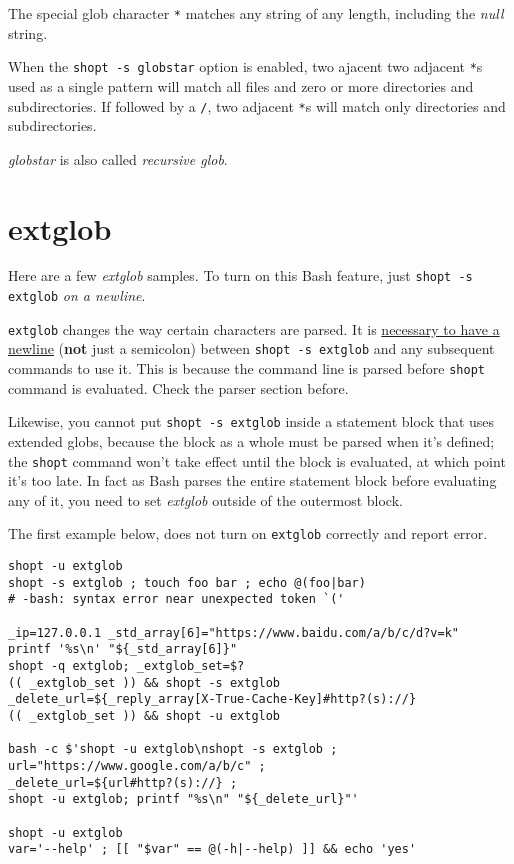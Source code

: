 The special glob character \lstinline|*| matches any string of any
length, including the \textit{null} string.

When the \lstinline|shopt -s globstar| option is enabled, two
ajacent two adjacent \lstinline|*|s used as a single pattern will
match all files and zero or more directories and subdirectories.
If followed by a \lstinline|/|, two adjacent \lstinline|*|s will
match only directories and subdirectories.

\textit{globstar} is also called \textit{recursive glob}.

\section{extglob}
\label{sec:bash-extglob}

Here are a few \textit{extglob} samples. To turn on this Bash
feature, just \lstinline|shopt -s extglob| \textit{on a newline}.

\lstinline|extglob| changes the way certain characters are
parsed. It is
\href{https://mywiki.wooledge.org/glob#extglob}{necessary to have
  a newline} (\textbf{not} just a semicolon) between
\lstinline|shopt -s extglob| and any subsequent commands to use
it. This is because the command line is parsed before
\lstinline|shopt| command is evaluated. Check the parser section
before.

Likewise, you cannot put \lstinline|shopt -s extglob| inside a
statement block that uses extended globs, because the block as a
whole must be parsed when it's defined; the \lstinline|shopt|
command won't take effect until the block is evaluated, at which
point it's too late. In fact as Bash parses the entire statement
block before evaluating any of it, you need to set
\textit{extglob} outside of the outermost block.

The first example below, does not turn on \lstinline|extglob|
correctly and report error.

\begin{minipage}{1.0\linewidth}
\begin{lstlisting}
shopt -u extglob
shopt -s extglob ; touch foo bar ; echo @(foo|bar)
# -bash: syntax error near unexpected token `('

_ip=127.0.0.1 _std_array[6]="https://www.baidu.com/a/b/c/d?v=k"
printf '%s\n' "${_std_array[6]}"
shopt -q extglob; _extglob_set=$?
(( _extglob_set )) && shopt -s extglob
_delete_url=${_reply_array[X-True-Cache-Key]#http?(s)://}
(( _extglob_set )) && shopt -u extglob

bash -c $'shopt -u extglob\nshopt -s extglob ; 
url="https://www.google.com/a/b/c" ;
_delete_url=${url#http?(s)://} ;
shopt -u extglob; printf "%s\n" "${_delete_url}"'

shopt -u extglob
var='--help' ; [[ "$var" == @(-h|--help) ]] && echo 'yes'
\end{lstlisting}  
\end{minipage}

